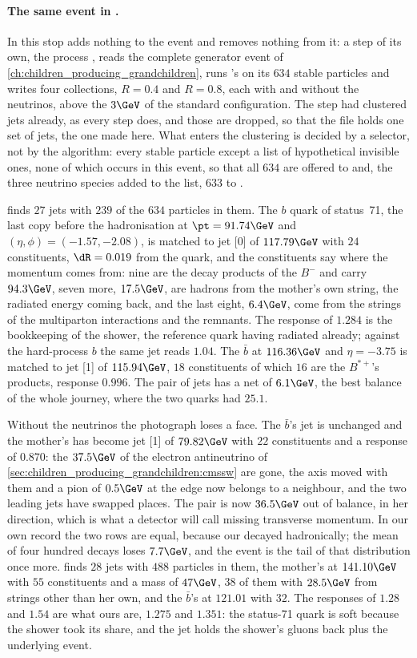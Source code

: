 \paragraph{The same event in \CMSSW.} In \CMSSW this stop adds nothing to
the event and removes nothing from it: a step of its own, the process
, reads the complete generator event of
\cref{ch:children_producing_grandchildren}, runs \FASTJET's \antikt on its
$634$ stable particles and writes four collections, $R=0.4$ and $R=0.8$,
each with and without the neutrinos, above the $3\GeV$ of the standard
configuration. The  step had clustered jets already, as every
 step does, and those are dropped, so that the file holds one
set of jets, the one made here. What enters the clustering is decided by
a selector, not by the algorithm: every stable particle except a list of
hypothetical invisible ones, none of which occurs in this event, so that
all $634$ are offered to \akfour and, the three neutrino species added to
the list, $633$ to \akfournonu.

\akfour finds $27$ jets with $239$ of the $634$ particles in them. The
$b$ quark of status~71, the last copy before the hadronisation at
$\pt=91.74\GeV$ and $(\eta,\phi)=(-1.57,-2.08)$, is matched to jet [0]
of $117.79\GeV$ with $24$ constituents, $\dR=0.019$ from the quark, and
the constituents say where the momentum comes from: nine are the decay
products of the $B^-$ and carry $94.3\GeV$, seven more, $17.5\GeV$, are
hadrons from the mother's own string, the radiated energy coming back,
and the last eight, $6.4\GeV$, come from the strings of the multiparton
interactions and the remnants. The response of $1.284$ is the bookkeeping
of the shower, the reference quark having radiated already; against the
hard-process $b$ the same jet reads $1.04$. The $\bar b$ at $116.36\GeV$
and $\eta=-3.75$ is matched to jet [1] of $115.94\GeV$, $18$
constituents of which $16$ are the $B^{*+}$'s products, response $0.996$.
The pair of jets has a net \pt of $6.1\GeV$, the best balance of the
whole journey, where the two quarks had $25.1$.

Without the neutrinos the photograph loses a face. The $\bar b$'s jet is
unchanged and the mother's has become jet [1] of $79.82\GeV$ with $22$
constituents and a response of $0.870$: the $37.5\GeV$ of the electron
antineutrino of \cref{sec:children_producing_grandchildren:cmssw} are
gone, the axis moved with them and a pion of $0.5\GeV$ at the edge now
belongs to a neighbour, and the two leading jets have swapped places.
The pair is now $36.5\GeV$ out of balance, in her direction, which is
what a detector will call missing transverse momentum. In our own record
the two rows are equal, because our \Bbar decayed hadronically; the mean
of four hundred decays loses $7.7\GeV$, and the \CMSSW event is the tail
of that distribution once more. \akeight finds $28$ jets with $488$
particles in them, the mother's at $141.10\GeV$ with $55$ constituents
and a mass of $47\GeV$, $38$ of them with $28.5\GeV$ from strings other
than her own, and the $\bar b$'s at $121.01$ with $32$. The responses of
$1.28$ and $1.54$ are what ours are, $1.275$ and $1.351$: the status-71
quark is soft because the shower took its share, and the jet holds the
shower's gluons back plus the underlying event.

